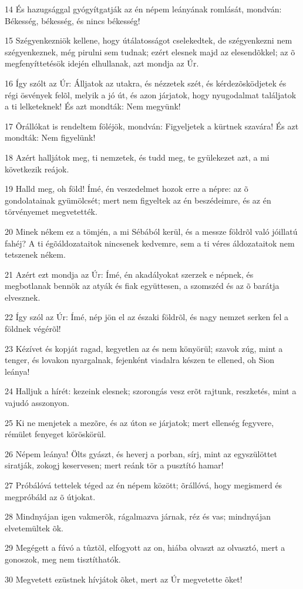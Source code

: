 \par 14 És hazugsággal gyógyítgatják az én népem leányának romlását, mondván: Békesség, békesség, és nincs békesség!
\par 15 Szégyenkezniök kellene, hogy útálatosságot cselekedtek, de szégyenkezni nem szégyenkeznek, még pirulni sem tudnak; ezért elesnek majd az elesendõkkel; az õ megfenyíttetésök idején elhullanak, azt mondja az Úr.
\par 16 Így szólt az Úr: Álljatok az utakra, és nézzetek szét, és kérdezõsködjetek és régi ösvények felõl, melyik a jó út, és azon járjatok, hogy nyugodalmat találjatok a ti lelketeknek! És azt mondták: Nem megyünk!
\par 17 Õrállókat is rendeltem föléjök, mondván: Figyeljetek a kürtnek szavára! És azt mondták: Nem figyelünk!
\par 18 Azért halljátok meg, ti nemzetek, és tudd meg, te gyülekezet azt, a mi következik reájok.
\par 19 Halld meg, oh föld! Ímé, én veszedelmet hozok erre a népre: az õ gondolatainak gyümölcsét; mert nem figyeltek az én beszédeimre, és az én törvényemet megvetették.
\par 20 Minek nékem ez a tömjén, a mi Sébából kerül, és a messze földrõl való jóillatú fahéj? A ti égõáldozataitok nincsenek kedvemre, sem a ti véres áldozataitok nem tetszenek nékem.
\par 21 Azért ezt mondja az Úr: Ímé, én akadályokat szerzek e népnek, és megbotlanak bennök az atyák és fiak együttesen, a szomszéd és az õ barátja elvesznek.
\par 22 Így szól az Úr: Ímé, nép jön el az északi földrõl, és nagy nemzet serken fel a földnek végérõl!
\par 23 Kézívet és kopját ragad, kegyetlen az és nem könyörül; szavok zúg, mint a tenger, és lovakon nyargalnak, fejenként viadalra készen te ellened, oh Sion leánya!
\par 24 Halljuk a hírét: kezeink elesnek; szorongás vesz erõt rajtunk, reszketés, mint a vajudó asszonyon.
\par 25 Ki ne menjetek a mezõre, és az úton se járjatok; mert ellenség fegyvere, rémület fenyeget köröskörül.
\par 26 Népem leánya! Ölts gyászt, és heverj a porban, sírj,  mint az egyszülöttet siratják, zokogj keservesen; mert reánk tör a pusztító hamar!
\par 27 Próbálóvá tettelek téged az én népem között; õrállóvá, hogy megismerd és megpróbáld az õ útjokat.
\par 28 Mindnyájan igen vakmerõk, rágalmazva járnak, réz és vas; mindnyájan elvetemültek õk.
\par 29 Megégett a fúvó a tûztõl, elfogyott az on, hiába olvaszt az olvasztó, mert a gonoszok, meg nem tisztíthatók.
\par 30 Megvetett ezüstnek hívjátok õket, mert az Úr megvetette õket!

